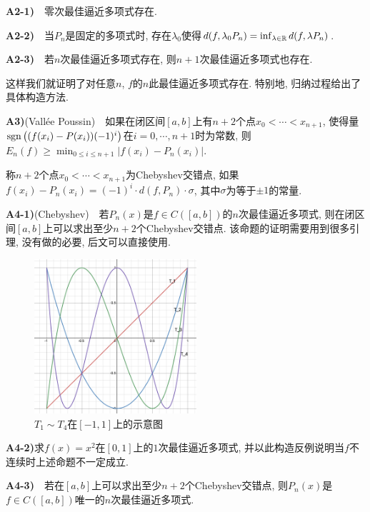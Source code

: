 \textbf{A2-1)}~~零次最佳逼近多项式存在. 

\textbf{A2-2)}~~当$P_n$是固定的多项式时, 存在$\lambda _0$使得$d(f,\lambda _0P_n) = \inf_{\lambda \in \mathbb{R}} d(f,\lambda P_n)$. 

\textbf{A2-3)}~~若$n$次最佳逼近多项式存在, 则$n+1$次最佳逼近多项式也存在. 

\vspace{1em}
这样我们就证明了对任意$n$, $f$的$n$此最佳逼近多项式存在. 特别地, 归纳过程给出了具体构造方法. 
\vspace{1em}

\textbf{A3)}(Vallée Poussin)~~如果在闭区间$[a,b]$上有$n+2$个点$x_0 <\cdots <x_{n+1}$, 使得量$\operatorname{sgn} \big( (f(x_i)-P(x_i))(-1)^i \big)$在$i=0,\cdots ,n+1$时为常数, 则$E_n(f) \geq \min_{0 \leq i \leq n+1} |f(x_i)-P_n(x_i)|$. 
\vspace{1em}

称$n+2$个点$x_0 < \cdots < x_{n+1}$为Chebyshev交错点, 如果$f(x_i)-P_n(x_i) = (-1)^i \cdot d(f,P_n) \cdot \sigma$, 其中$\sigma$为等于$\pm 1$的常量. 

\vspace{1em}
\textbf{A4-1)}(Chebyshev)~~若$P_n(x)$是$f \in C([a,b])$的$n$次最佳逼近多项式, 则在闭区间$[a,b]$上可以求出至少$n+2$个Chebyshev交错点. {\color{blue}该命题的证明需要用到很多引理, 没有做的必要, 后文可以直接使用. }

\begin{figure}
	\includegraphics[width=6cm]{attachment/iShot_2024-02-01_18.43.57.png}
	\caption{\small $T_1 \sim T_4$在$[-1,1]$上的示意图}
\end{figure}

\textbf{A4-2)}求$f(x)=x^2$在$[0,1]$上的$1$次最佳逼近多项式, 并以此构造反例说明当$f$不连续时上述命题不一定成立. 

\textbf{A4-3)}~~若在$[a,b]$上可以求出至少$n+2$个Chebyshev交错点, 则$P_n(x)$是$f \in C([a,b])${\color{blue}唯一}的$n$次最佳逼近多项式. 

